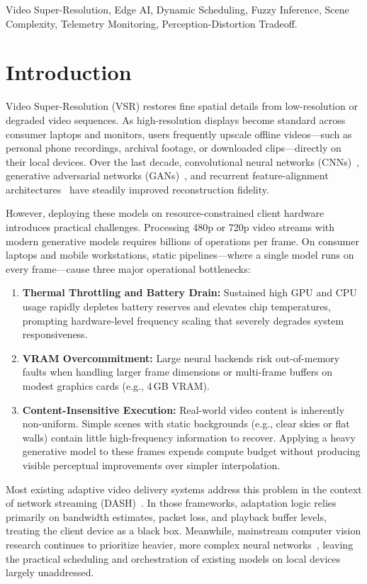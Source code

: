 \documentclass[conference]{IEEEtran}
\begin{document}
\begin{IEEEkeywords}
Video Super-Resolution, Edge AI, Dynamic Scheduling, Fuzzy Inference, Scene Complexity, Telemetry Monitoring, Perception-Distortion Tradeoff.
\end{IEEEkeywords}

\section{Introduction}
Video Super-Resolution (VSR) restores fine spatial details from low-resolution or degraded video sequences. As high-resolution displays become standard across consumer laptops and monitors, users frequently upscale offline videos—such as personal phone recordings, archival footage, or downloaded clips—directly on their local devices. Over the last decade, convolutional neural networks (CNNs)~\cite{dong2016accelerating}, generative adversarial networks (GANs)~\cite{wang2021realesrgan}, and recurrent feature-alignment architectures~\cite{chan2022basicvsrpp} have steadily improved reconstruction fidelity.

However, deploying these models on resource-constrained client hardware introduces practical challenges. Processing 480p or 720p video streams with modern generative models requires billions of operations per frame. On consumer laptops and mobile workstations, static pipelines—where a single model runs on every frame—cause three major operational bottlenecks:
\begin{enumerate}
    \item \textbf{Thermal Throttling and Battery Drain:} Sustained high GPU and CPU usage rapidly depletes battery reserves and elevates chip temperatures, prompting hardware-level frequency scaling that severely degrades system responsiveness.
    \item \textbf{VRAM Overcommitment:} Large neural backends risk out-of-memory faults when handling larger frame dimensions or multi-frame buffers on modest graphics cards (e.g., 4\,GB VRAM).
    \item \textbf{Content-Insensitive Execution:} Real-world video content is inherently non-uniform. Simple scenes with static backgrounds (e.g., clear skies or flat walls) contain little high-frequency information to recover. Applying a heavy generative model to these frames expends compute budget without producing visible perceptual improvements over simpler interpolation.
\end{enumerate}

Most existing adaptive video delivery systems address this problem in the context of network streaming (DASH)~\cite{noh2023energy, zhang2026joint}. In those frameworks, adaptation logic relies primarily on bandwidth estimates, packet loss, and playback buffer levels, treating the client device as a black box. Meanwhile, mainstream computer vision research continues to prioritize heavier, more complex neural networks~\cite{tang2024vmg, li2026collaborative, lee2025enhanced}, leaving the practical scheduling and orchestration of existing models on local devices largely unaddressed.
\end{document}
